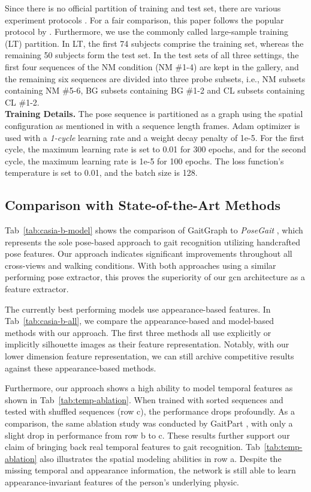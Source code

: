 \documentclass{article}
\newcommand{\nparagraph}[1]{\noindent\textbf{#1.  }}
\begin{document}
Since there is no official partition of training and test set, there are various experiment protocols \cite{zhang2019gait}. For a fair comparison, this paper follows the popular protocol by \cite{wu2016comprehensive}. Furthermore, we use the commonly called large-sample training (LT) partition. In LT, the first 74 subjects comprise the training set, whereas the remaining 50 subjects form the test set. In the test sets of all three settings, the first four sequences of the NM condition (NM \#1-4) are kept in the gallery, and the remaining six sequences are divided into three probe subsets, i.e., NM subsets containing NM \#5-6, BG subsets containing BG \#1-2 and CL subsets containing CL \#1-2.\\


\nparagraph{Training Details}
The pose sequence is partitioned as a graph using the spatial configuration as mentioned in \cite{yan2018spatial} with a sequence length  frames. Adam optimizer is used with a \textit{1-cycle} learning rate \cite{smith2019super} and a weight decay penalty of 1e-5. For the first cycle, the maximum learning rate is set to 0.01 for 300 epochs, and for the second cycle, the maximum learning rate is 1e-5 for 100 epochs. The loss function's temperature is set to 0.01, and the batch size is 128.


\subsection{Comparison with State-of-the-Art Methods}
Tab~\ref{tab:casia-b-model} shows the comparison of GaitGraph to \textit{PoseGait} \cite{liao2017pose}, which represents the sole pose-based approach to gait recognition utilizing handcrafted pose features. Our approach indicates significant improvements throughout all cross-views and walking conditions. With both approaches using a similar performing pose extractor, this proves the superiority of our \gls{gcn} architecture as a feature extractor. 

The currently best performing models use appearance-based features. In Tab~\ref{tab:casia-b-all}, we compare the appearance-based and model-based methods with our approach. The first three methods all use explicitly \cite{chao2019gaitset, fan2020gaitpart} or implicitly \cite{chao2019gaitset} silhouette images as their feature representation. Notably, with our lower dimension feature representation, we can still archive competitive results against these appearance-based methods.

Furthermore, our approach shows a high ability to model temporal features as shown in Tab~\ref{tab:temp-ablation}. When trained with sorted sequences and tested with shuffled sequences (row c), the performance drops profoundly. As a comparison, the same ablation study was conducted by GaitPart \cite{fan2020gaitpart}, with only a slight drop in performance from row b to c. These results further support our claim of bringing back real temporal features to gait recognition. Tab~\ref{tab:temp-ablation} also illustrates the spatial modeling abilities in row a. Despite the missing temporal and appearance information, the network is still able to learn appearance-invariant features of the person's underlying physic.
\end{document}
